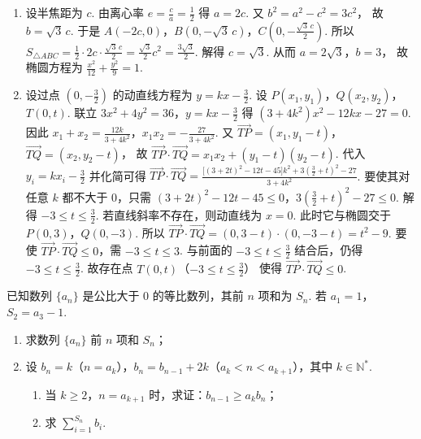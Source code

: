 \begin{solution}
\begin{enumerate}
    \item 设半焦距为 \(c\). 由离心率
\(e=\frac{c}{a}=\frac12\)
得
\(a=2c\).
又
\(b^2=a^2-c^2=3c^2\)，
故
\(b=\sqrt3\,c\).
于是
\(A(-2c,0)\)，\(B(0,-\sqrt3\,c)\)，\(C\left(0,-\frac{\sqrt3\,c}{2}\right)\).
所以
\(S_{\triangle ABC} =\frac12\cdot 2c\cdot \frac{\sqrt3\,c}{2} =\frac{\sqrt3}{2}c^2 =\frac{3\sqrt3}{2}\).
解得
\(c=\sqrt3\).
从而
\(a=2\sqrt3\)，\(b=3\)，
故椭圆方程为
\(\frac{x^2}{12}+\frac{y^2}{9}=1\).

    \item 设过点 \(\left(0,-\frac32\right)\) 的动直线方程为
\(y=kx-\frac32\).
设
\(P(x_1,y_1)\)，\(Q(x_2,y_2)\)，\(T(0,t)\).
联立 \(3x^2+4y^2=36\)，\(y=kx-\frac32\) 得
\((3+4k^2)x^2-12kx-27=0\).
因此
\(x_1+x_2=\frac{12k}{3+4k^2}\)，\(x_1x_2=-\frac{27}{3+4k^2}\).
又
\(\overrightarrow{TP}=(x_1,y_1-t)\)，\(\overrightarrow{TQ}=(x_2,y_2-t)\)，
故
\(\overrightarrow{TP}\cdot \overrightarrow{TQ} =x_1x_2+(y_1-t)(y_2-t)\).
代入 \(y_i=kx_i-\frac32\) 并化简可得
\(\overrightarrow{TP}\cdot \overrightarrow{TQ} =\frac{\bigl[(3+2t)^2-12t-45\bigr]k^2+3\left(\frac32+t\right)^2-27}{3+4k^2}\).
要使其对任意 \(k\) 都不大于 0，只需 \((3+2t)^2-12t-45\le 0\)，\(3\left(\frac32+t\right)^2-27\le 0\).
解得
\(-3\le t\le \frac32\).
若直线斜率不存在，则动直线为
\(x=0\).
此时它与椭圆交于
\(P(0,3)\)，\(Q(0,-3)\).
所以
\(\overrightarrow{TP}\cdot \overrightarrow{TQ} =(0,3-t)\cdot(0,-3-t) =t^2-9\).
要使 \(\overrightarrow{TP}\cdot \overrightarrow{TQ}\le 0\)，需
\(-3\le t\le 3\).
与前面的 \(-3\le t\le \frac32\) 结合后，仍得
\(-3\le t\le \frac32\).
故存在点
\(T(0,t)\)（\(-3\le t\le \frac32\)）
使得 \(\overrightarrow{TP}\cdot \overrightarrow{TQ}\le 0\).
\end{enumerate}
\end{solution}

\begin{problem}
已知数列 \(\{a_n\}\) 是公比大于 0 的等比数列，其前 \(n\) 项和为 \(S_n\). 若 \(a_1=1\)，\(S_2=a_3-1\).
\begin{enumerate}
    \item 求数列 \(\{a_n\}\) 前 \(n\) 项和 \(S_n\)；
    \item 设 \(b_n=k\)（\(n=a_k\)），\(b_n=b_{n-1}+2k\)（\(a_k<n<a_{k+1}\)），其中 \(k\in \mathbb N^*\).
    \begin{enumerate}
        \item 当 \(k\ge 2\)，\(n=a_{k+1}\) 时，求证：\(b_{n-1}\ge a_k b_n\)；
        \item 求 \(\displaystyle \sum_{i=1}^{S_n}b_i\).
    \end{enumerate}
\end{enumerate}
\end{problem}

